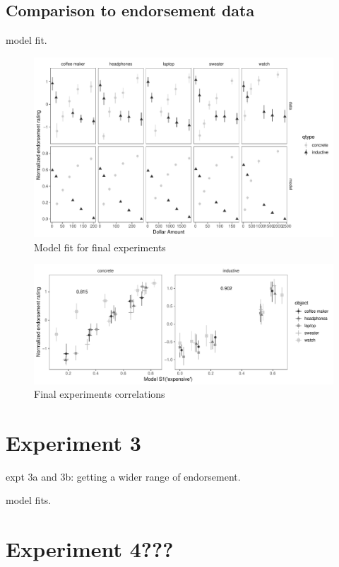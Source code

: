 \documentclass[11pt]{amsart}
\begin{document}
\subsection{Comparison to endorsement data}
model fit. 

\begin{figure}
\includegraphics[width=\textwidth]{../analysis/img/reproduce_old_plots_inductive_s1_fit_cost_model.pdf}
\caption{Model fit for final experiments}
\end{figure}

\begin{figure}
\includegraphics[width=\textwidth]{../analysis/img/reproduce_old_plots_inductive_s1_fit_cost_cor.pdf}
\caption{Final experiments correlations}
\end{figure}

\section{Experiment 3}
\label{exp3}

expt 3a and 3b: getting a wider range of endorsement. 

model fits.

\section{Experiment 4???}
\end{document}
